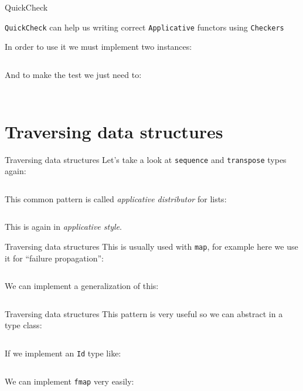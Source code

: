\documentclass[10pt]{beamer}
\newcommand\Fontvi{\fontsize{10}{12}\selectfont}
\begin{document}
\begin{frame}{QuickCheck}

  \verb~QuickCheck~ can help us writing correct \verb~Applicative~
  functors using \verb~Checkers~

  In order to use it we must implement two instances:

  \inputminted{haskell}{../src/ArbitraryEqClass.hs}

  And to make the test we just need to:

  \inputminted{haskell}{../src/trigger.hs}
\end{frame}

\begin{frame}[standout]
  \Fontvi
  \inputminted{text}{../src/testOut.txt}
\end{frame}

\section{Traversing data structures}

\begin{frame}{Traversing data structures}
  Let's take a look at \verb~sequence~ and \verb~transpose~ types
  again:

  \inputminted{haskell}{../src/trav_typ.hs}

  This common pattern is called \textit{applicative distributor} for
  lists:

  \inputminted{haskell}{../src/dist.hs}

  This is again in \textit{applicative style}.
\end{frame}

\begin{frame}{Traversing data structures}
  This is usually used with \verb~map~, for example here we use it for
  ``failure propagation'':

  \inputminted{haskell}{../src/flakyMap.hs}

  We can implement a generalization of this:

  \inputminted{haskell}{../src/traverse.hs}
\end{frame}

\begin{frame}{Traversing data structures}
  This pattern is very useful so we can abstract in a type class:

  \inputminted{haskell}{../src/traversable.hs}

  If we implement an \verb~Id~ type like:

  \inputminted{haskell}{../src/Id.hs}

  We can implement \verb~fmap~ very easily:

  \inputminted{haskell}{../src/traversable_fmap.hs}

\end{frame}
\end{document}
